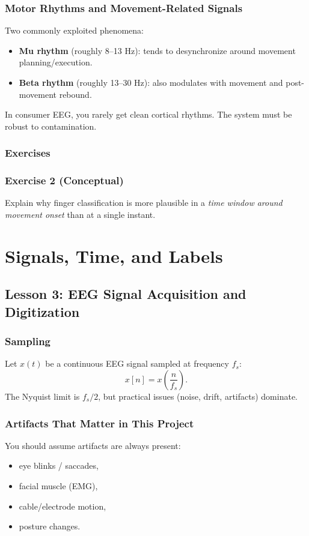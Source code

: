 \documentclass[11pt,openany]{book}
\newcommand{\exercise}[2]{%
\section*{Exercise #1}
#2
}
\begin{document}
\section{Motor Rhythms and Movement-Related Signals}

Two commonly exploited phenomena:
\begin{itemize}
\item \textbf{Mu rhythm} (roughly 8--13 Hz): tends to desynchronize around movement planning/execution.
\item \textbf{Beta rhythm} (roughly 13--30 Hz): also modulates with movement and post-movement rebound.
\end{itemize}

In consumer EEG, you rarely get clean cortical rhythms. The system must be robust to contamination.

\section{Exercises}

\exercise{2 (Conceptual)}{
Explain why finger classification is more plausible in a \emph{time window around movement onset}
than at a single instant.
}

\part{Signals, Time, and Labels}

\chapter{Lesson 3: EEG Signal Acquisition and Digitization}

\section{Sampling}

Let $x(t)$ be a continuous EEG signal sampled at frequency $f_s$:
\[
x[n] = x\left(\frac{n}{f_s}\right).
\]
The Nyquist limit is $f_s/2$, but practical issues (noise, drift, artifacts) dominate.

\section{Artifacts That Matter in This Project}

You should assume artifacts are always present:
\begin{itemize}
  \item eye blinks / saccades,
  \item facial muscle (EMG),
  \item cable/electrode motion,
  \item posture changes.
\end{itemize}
\end{document}
